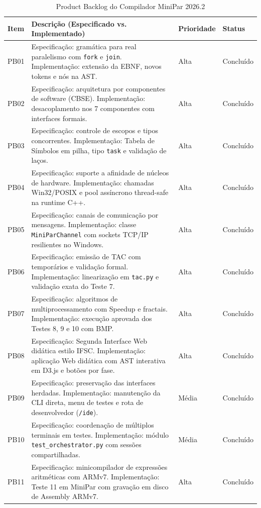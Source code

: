 \begin{table}[htbp]
\centering
\caption{Product Backlog do Compilador MiniPar 2026.2}
\label{tab:product_backlog}
\small
\begin{tabular}{p{1.2cm}p{9.4cm}p{1.8cm}p{1.8cm}}
\toprule
Item & Descrição (Especificado vs. Implementado) & Prioridade & Status \\
\midrule
PB01 & Especificação: gramática para real paralelismo com \texttt{fork} e \texttt{join}. Implementação: extensão da EBNF, novos tokens e nós na AST. & Alta & Concluído \\
PB02 & Especificação: arquitetura por componentes de software (CBSE). Implementação: desacoplamento nos 7 componentes com interfaces formais. & Alta & Concluído \\
PB03 & Especificação: controle de escopos e tipos concorrentes. Implementação: Tabela de Símbolos em pilha, tipo \texttt{task} e validação de laços. & Alta & Concluído \\
PB04 & Especificação: suporte a afinidade de núcleos de hardware. Implementação: chamadas Win32/POSIX e pool assíncrono thread-safe na runtime C++. & Alta & Concluído \\
PB05 & Especificação: canais de comunicação por mensagens. Implementação: classe \texttt{MiniParChannel} com sockets TCP/IP resilientes no Windows. & Alta & Concluído \\
PB06 & Especificação: emissão de TAC com temporários e validação formal. Implementação: linearização em \texttt{tac.py} e validação exata do Teste 7. & Alta & Concluído \\
PB07 & Especificação: algoritmos de multiprocessamento com Speedup e fractais. Implementação: execução aprovada dos Testes 8, 9 e 10 com BMP. & Alta & Concluído \\
PB08 & Especificação: Segunda Interface Web didática estilo IFSC. Implementação: aplicação Web didática com AST interativa em D3.js e botões por fase. & Alta & Concluído \\
PB09 & Especificação: preservação das interfaces herdadas. Implementação: manutenção da CLI direta, menu de testes e rota de desenvolvedor (\texttt{/ide}). & Média & Concluído \\
PB10 & Especificação: coordenação de múltiplos terminais em testes. Implementação: módulo \texttt{test\_orchestrator.py} com sessões compartilhadas. & Média & Concluído \\
PB11 & Especificação: minicompilador de expressões aritméticas com ARMv7. Implementação: Teste 11 em MiniPar com gravação em disco de Assembly ARMv7. & Alta & Concluído \\

\end{tabular}
\end{table}
